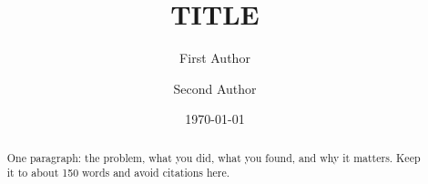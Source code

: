 \documentclass[aps,prl,reprint,superscriptaddress,amsmath,amssymb]{revtex4-2}
\begin{document}
\title{{{TITLE}}}

\author{First Author}
\author{Second Author}

\date{\today}

\begin{abstract}
One paragraph: the problem, what you did, what you found, and why it matters. Keep it to about 150 words and avoid citations here.
\end{abstract}

\maketitle





\end{document}
